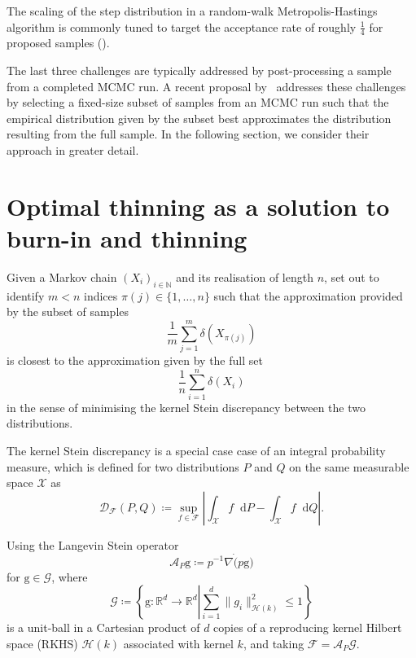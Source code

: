 \documentclass[12pt,a4paper]{report}
\newcommand*\diff{\mathop{}\!\mathrm{d}}
\begin{document}
The scaling of the step distribution in a random-walk Metropolis-Hastings algorithm is commonly tuned to target the acceptance rate of roughly $\frac{1}{4}$ for proposed samples (\cite{gelmanEfficientMetropolisJumping1996,gelmanWeakConvergenceOptimal1997,robertsOptimalScalingVarious2001}).

The last three challenges are typically addressed by post-processing a sample from a completed MCMC run. A recent proposal by~\cite{riabizOptimalThinningMCMC2022} addresses these challenges by selecting a fixed-size subset of samples from an MCMC run such that the empirical distribution given by the subset best approximates the distribution resulting from the full sample. In the following section, we consider their approach in greater detail.


\section{Optimal thinning as a solution to burn-in and thinning}

Given a Markov chain $(X_i)_{i \in \mathbb{N}}$ and its realisation of length $n$, \cite{riabizOptimalThinningMCMC2022} set out to identify $m < n$ indices $\pi(j) \in \{1,\dots, n\}$ such that the approximation provided by the subset of samples
$$\frac{1}{m} \sum_{j=1}^m \delta(X_{\pi(j)})$$
is closest to the approximation given by the full set
$$\frac{1}{n} \sum_{i=1}^n \delta(X_i)$$
in the sense of minimising the kernel Stein discrepancy between the two distributions.

The kernel Stein discrepancy is a special case case of an integral probability measure, which is defined for two distributions $P$ and $Q$ on the same measurable space $\mathcal{X}$ as
$$\mathcal{D}_{\mathcal{F}}(P, Q) \coloneq \sup_{f \in \mathcal{F}}\left|\int_\mathcal{X} f \diff P - \int_\mathcal{X} f \diff Q \right|.$$

Using the Langevin Stein operator 
$$\mathcal{A}_P \mathrm{g} \coloneq p^{-1} \nabla \dot (p \mathrm{g})$$
for $\mathrm{g} \in \mathcal{G}$, where
$$\mathcal{G} \coloneq \left\{ \mathrm{g} : \mathbb{R}^d \to \mathbb{R}^d \left| \sum_{i=1}^d \|g_i\|^2_{\mathcal{H}(k)} \leq 1 \right.\right\}$$
is a unit-ball in a Cartesian product of $d$ copies of a reproducing kernel Hilbert space (RKHS) $\mathcal{H}(k)$ associated with kernel $k$, and taking $\mathcal{F} = \mathcal{A}_P \mathcal{G}$.
\end{document}
